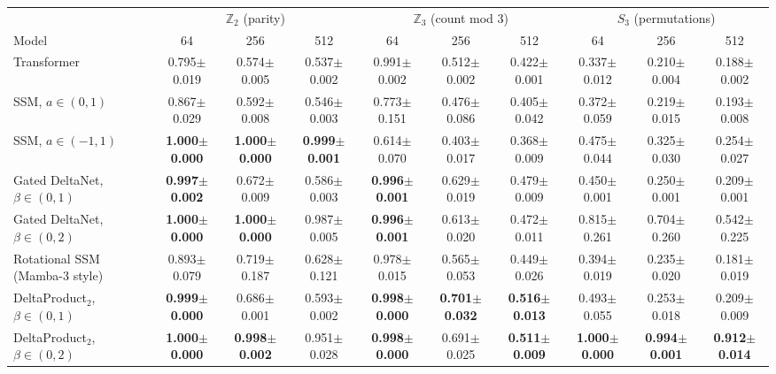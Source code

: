 \begin{tabular}{lccccccccc}
\toprule
 & \multicolumn{3}{c}{$\mathbb{Z}_2$ (parity)} & \multicolumn{3}{c}{$\mathbb{Z}_3$ (count mod 3)} & \multicolumn{3}{c}{$S_3$ (permutations)} \\
\cmidrule(lr){2-4} \cmidrule(lr){5-7} \cmidrule(lr){8-10}
Model & 64 & 256 & 512 & 64 & 256 & 512 & 64 & 256 & 512 \\
\midrule
Transformer & 0.795$\pm$0.019 & 0.574$\pm$0.005 & 0.537$\pm$0.002 & 0.991$\pm$0.002 & 0.512$\pm$0.002 & 0.422$\pm$0.001 & 0.337$\pm$0.012 & 0.210$\pm$0.004 & 0.188$\pm$0.002 \\
SSM, $a\in(0,1)$ & 0.867$\pm$0.029 & 0.592$\pm$0.008 & 0.546$\pm$0.003 & 0.773$\pm$0.151 & 0.476$\pm$0.086 & 0.405$\pm$0.042 & 0.372$\pm$0.059 & 0.219$\pm$0.015 & 0.193$\pm$0.008 \\
SSM, $a\in(-1,1)$ & \textbf{1.000$\pm$0.000} & \textbf{1.000$\pm$0.000} & \textbf{0.999$\pm$0.001} & 0.614$\pm$0.070 & 0.403$\pm$0.017 & 0.368$\pm$0.009 & 0.475$\pm$0.044 & 0.325$\pm$0.030 & 0.254$\pm$0.027 \\
Gated DeltaNet, $\beta\in(0,1)$ & \textbf{0.997$\pm$0.002} & 0.672$\pm$0.009 & 0.586$\pm$0.003 & \textbf{0.996$\pm$0.001} & 0.629$\pm$0.019 & 0.479$\pm$0.009 & 0.450$\pm$0.001 & 0.250$\pm$0.001 & 0.209$\pm$0.001 \\
Gated DeltaNet, $\beta\in(0,2)$ & \textbf{1.000$\pm$0.000} & \textbf{1.000$\pm$0.000} & 0.987$\pm$0.005 & \textbf{0.996$\pm$0.001} & 0.613$\pm$0.020 & 0.472$\pm$0.011 & 0.815$\pm$0.261 & 0.704$\pm$0.260 & 0.542$\pm$0.225 \\
\midrule
Rotational SSM (Mamba-3 style) & 0.893$\pm$0.079 & 0.719$\pm$0.187 & 0.628$\pm$0.121 & 0.978$\pm$0.015 & 0.565$\pm$0.053 & 0.449$\pm$0.026 & 0.394$\pm$0.019 & 0.235$\pm$0.020 & 0.181$\pm$0.019 \\
DeltaProduct$_2$, $\beta\in(0,1)$ & \textbf{0.999$\pm$0.000} & 0.686$\pm$0.001 & 0.593$\pm$0.002 & \textbf{0.998$\pm$0.000} & \textbf{0.701$\pm$0.032} & \textbf{0.516$\pm$0.013} & 0.493$\pm$0.055 & 0.253$\pm$0.018 & 0.209$\pm$0.009 \\
DeltaProduct$_2$, $\beta\in(0,2)$ & \textbf{1.000$\pm$0.000} & \textbf{0.998$\pm$0.002} & 0.951$\pm$0.028 & \textbf{0.998$\pm$0.000} & 0.691$\pm$0.025 & \textbf{0.511$\pm$0.009} & \textbf{1.000$\pm$0.000} & \textbf{0.994$\pm$0.001} & \textbf{0.912$\pm$0.014} \\
\bottomrule
\end{tabular}
